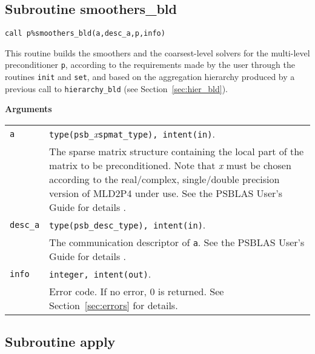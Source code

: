 \clearpage

\subsection{Subroutine smoothers\_bld\label{sec:smoothers_bld}}
 

\begin{center}
\verb|call p%smoothers_bld(a,desc_a,p,info)|\\
\end{center}

\noindent
This routine builds the smoothers and the coarsest-level solvers for the
multi-level preconditioner \verb|p|, according to the requirements made by
the user through the routines \verb|init| and \verb|set|, and based on the aggregation
hierarchy produced by a previous call to \verb|hierarchy_bld|
(see Section~\ref{sec:hier_bld}). 

{\baselineskip\noindent\large\bfseries Arguments} \smallskip

\begin{tabular}{p{1.2cm}p{12cm}}
\verb|a|      & \verb|type(psb_|\emph{x}\verb|spmat_type), intent(in)|. \\
              & The sparse matrix structure containing the local part of the
                matrix to be preconditioned. Note that \emph{x} must be chosen according
                to the real/complex, single/double precision version of MLD2P4 under use.
                See the PSBLAS User's Guide for details \cite{PSBLASGUIDE}.\\
\verb|desc_a| & \verb|type(psb_desc_type), intent(in)|. \\
              & The communication descriptor of \verb|a|. See the PSBLAS User's Guide for
                details \cite{PSBLASGUIDE}.\\
\verb|info|   & \verb|integer, intent(out)|.\\
              & Error code. If no error, 0 is returned. See Section~\ref{sec:errors} for details.\\
\end{tabular}

\clearpage
\subsection{Subroutine apply\label{sec:precapply}}

